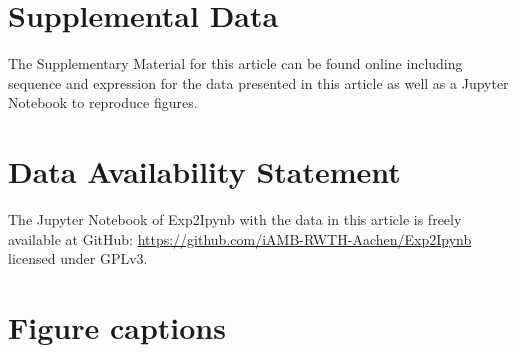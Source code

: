 \documentclass[utf8]{frontiersSCNS} %
\begin{document}
\section*{Supplemental Data}
The Supplementary Material for this article can be found online including sequence and expression for the data presented in this article as well as a Jupyter Notebook to reproduce figures.

\section*{Data Availability Statement}
The Jupyter Notebook of Exp2Ipynb with the data in this article is freely available at GitHub: \href{https://github.com/iAMB-RWTH-Aachen/Exp2Ipynb}{https://github.com/iAMB-RWTH-Aachen/Exp2Ipynb} licensed under GPLv3.



\newpage
\section*{Figure captions}
\end{document}
